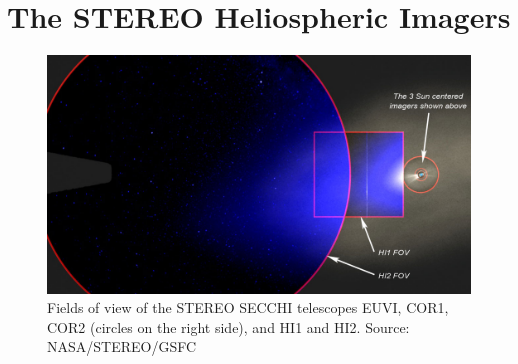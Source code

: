 \section{The STEREO Heliospheric Imagers}
\label{sec:stereohi}

\begin{figure}
    \centering
    \includegraphics[width=0.8\linewidth]{images/secchi_fov}
    \caption[Fields of view of the \acs{STEREO} SECCHI telescopes]{Fields of view of the \ac{STEREO} SECCHI telescopes EUVI, COR1, COR2 (circles on the right side), and HI1 and HI2. Source: NASA/STEREO/GSFC}
    \label{fig:secchifov}
\end{figure}
